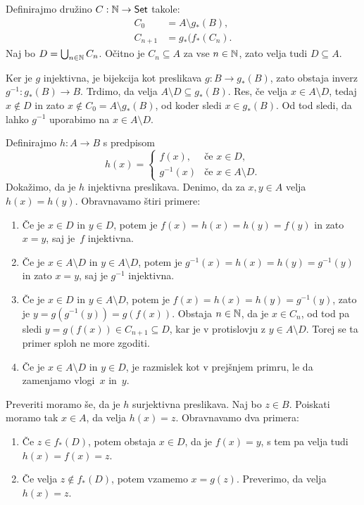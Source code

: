 \begin{dokaz}
  Definirajmo družino $C : \mathbb{N} \to \mathsf{Set}$ takole:
  \begin{align*}
    C_0 &= A \setminus g_{*}(B), \\
    C_{n+1} &= g_{*}(f_{*}(C_n).
  \end{align*}
  Naj bo $D = \bigcup_{n \in \mathbb{N}} C_n$. Očitno je $C_n \subseteq A$ za vse
  $n \in \mathbb{N}$, zato velja tudi $D \subseteq A$.

  Ker je $g$ injektivna, je bijekcija kot preslikava $g : B \to g_{*}(B)$, zato
  obstaja inverz $g^{-1} : g_{*}(B) \to B$. Trdimo, da velja
  $A \setminus D \subseteq g_{*}(B)$. Res, če velja $x \in A \setminus D$, tedaj
  $x \not\in D$ in zato $x \not\in C_0 = A \setminus g_{*}(B)$, od koder sledi
  $x \in g_{*}(B)$. Od tod sledi, da lahko $g^{-1}$ uporabimo na
  $x \in A \setminus D$.

  Definirajmo $h : A \to B$ s predpisom
  \begin{equation*}
    h(x) =
    \begin{cases}
      f(x), & \text{če $x \in D$,} \\
      g^{-1}(x) &\text{če $x \in A \setminus D$.}
    \end{cases}
  \end{equation*}
  Dokažimo, da je $h$ injektivna preslikava.
  Denimo, da za $x, y \in A$ velja $h(x) = h(y)$. Obravnavamo štiri primere:
  \begin{enumerate}
  \item Če je $x \in D$ in $y \in D$, potem je $f(x) = h(x) = h(y) = f(y)$ in
    zato $x = y$, saj je~$f$ injektivna.
  \item Če je $x \in A \setminus D$ in $y \in A \setminus D$, potem je
    $g^{-1}(x) = h(x) = h(y) = g^{-1}(y)$ in zato $x = y$, saj je $g^{-1}$
    injektivna.
  \item Če je $x \in D$ in $y \in A \setminus D$, potem je
    $f(x) = h(x) = h(y) = g^{-1}(y)$, zato je $y = g(g^{-1}(y)) = g(f(x))$.
    Obstaja $n \in \mathbb{N}$, da je $x \in C_n$, od tod pa sledi
    $y = g(f(x)) \in C_{n+1} \subseteq D$, kar je v protislovju z
    $y \in A \setminus D$. Torej se ta primer sploh ne more zgoditi.
  \item Če je $x \in A \setminus D$ in $y \in D$, je razmislek kot v prejšnjem
    primru, le da zamenjamo vlogi~$x$ in~$y$.
  \end{enumerate}

  Preveriti moramo še, da je $h$ surjektivna preslikava. Naj bo $z \in B$.
  Poiskati moramo tak $x \in A$, da velja $h(x) = z$. Obravnavamo dva primera:
  \begin{enumerate}
  \item Če $z \in f_{*}(D)$, potem obstaja $x \in D$, da je $f(x) = y$, s tem pa
    velja tudi $h(x) = f(x) = z$.
  \item Če velja $z \not\in f_{*}(D)$, potem vzamemo $x = g(z)$. Preverimo, da
    velja $h(x) = z$.


\end{enumerate}
\end{dokaz}
